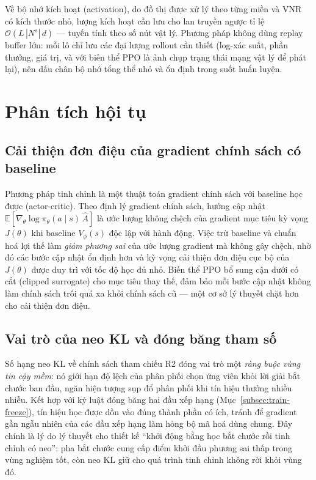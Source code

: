 \documentclass[../DoAn.tex]{subfiles}
\begin{document}
Về bộ nhớ kích hoạt (activation), do đồ thị được xử lý theo từng miền và VNR có kích thước nhỏ, lượng kích hoạt cần lưu cho lan truyền ngược tỉ lệ $\mathcal{O}(L\,|N^s|\,d)$ — tuyến tính theo số nút vật lý. Phương pháp không dùng replay buffer lớn: mỗi lô chỉ lưu các đại lượng rollout cần thiết (log-xác suất, phần thưởng, giá trị, và với biến thể PPO là ảnh chụp trạng thái mạng vật lý để phát lại), nên dấu chân bộ nhớ tổng thể nhỏ và ổn định trong suốt huấn luyện.

\section{Phân tích hội tụ}                   %
\label{sec:convergence}

\subsection{Cải thiện đơn điệu của gradient chính sách có baseline}
\label{subsec:conv-monotonic}

Phương pháp tinh chỉnh là một thuật toán gradient chính sách với baseline học được (actor-critic). Theo định lý gradient chính sách, hướng cập nhật $\mathbb{E}[\nabla_\theta \log\pi_\theta(a\mid s)\,\hat{A}]$ là ước lượng không chệch của gradient mục tiêu kỳ vọng $J(\theta)$ khi baseline $V_\phi(s)$ độc lập với hành động. Việc trừ baseline và chuẩn hoá lợi thế làm \textit{giảm phương sai} của ước lượng gradient mà không gây chệch, nhờ đó các bước cập nhật ổn định hơn và kỳ vọng cải thiện đơn điệu cục bộ của $J(\theta)$ được duy trì với tốc độ học đủ nhỏ. Biến thể PPO bổ sung cận dưới có cắt (clipped surrogate) cho mục tiêu thay thế, đảm bảo mỗi bước cập nhật không làm chính sách trôi quá xa khỏi chính sách cũ — một cơ sở lý thuyết chặt hơn cho cải thiện đơn điệu.

\subsection{Vai trò của neo KL và đóng băng tham số}
\label{subsec:conv-kl}

Số hạng neo KL về chính sách tham chiếu R2 đóng vai trò một \textit{ràng buộc vùng tin cậy mềm}: nó giới hạn độ lệch của phân phối chọn ứng viên khỏi lời giải bắt chước ban đầu, ngăn hiện tượng sụp đổ phân phối khi tín hiệu thưởng nhiều nhiễu. Kết hợp với kỷ luật đóng băng hai đầu xếp hạng (Mục~\ref{subsec:train-freeze}), tín hiệu học được dồn vào đúng thành phần có ích, tránh để gradient gần ngẫu nhiên của các đầu xếp hạng làm hỏng bộ mã hoá dùng chung. Đây chính là lý do lý thuyết cho thiết kế ``khởi động bằng học bắt chước rồi tinh chỉnh có neo'': pha bắt chước cung cấp điểm khởi đầu phương sai thấp trong vùng nghiệm tốt, còn neo KL giữ cho quá trình tinh chỉnh không rời khỏi vùng đó.
\end{document}
